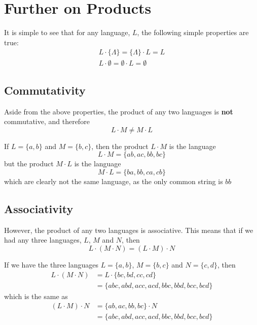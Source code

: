 \section*{Further on Products}

It is simple to see that for any language, $L$, the following simple properties are true:
\begin{gather*}
  L \cdot \{\Lambda\} = \{\Lambda\} \cdot L = L\\
  L \cdot \emptyset = \emptyset \cdot L = \emptyset
\end{gather*}

\subsection*{Commutativity}

Aside from the above properties, the product of any two languages is \textbf{not} commutative, and therefore
\begin{equation*}
  L \cdot M \neq M \cdot L
\end{equation*}

\begin{example*}{}{}
  If $L = \{a, b\}$ and $M = \{b, c\}$, then the product $L \cdot M$ is the language
  \begin{equation*}
    L \cdot M = \{ab, ac, bb, bc\}
  \end{equation*}
  but the product $M \cdot L$ is the language
  \begin{equation*}
    M \cdot L = \{ba, bb, ca, cb\}
  \end{equation*}
  which are clearly not the same language, as the only common string is $bb$
\end{example*}

\subsection*{Associativity}

However, the product of any two languages is associative. This means that if we had any three languages, $L$, $M$ and
 $N$, then
\begin{equation*}
  L \cdot (M \cdot N) = (L \cdot M) \cdot N
\end{equation*}

\begin{example*}{}{}
  If we have the three languages $L = \{a, b\}$, $M = \{b, c\}$ and $N = \{c, d\}$, then
  \begin{align*}
    L \cdot (M \cdot N) &= L \cdot \{bc, bd, cc, cd\}\\
    &= \{abc, abd, acc, acd, bbc, bbd, bcc, bcd\}
  \end{align*}
  which is the same as
  \begin{align*}
    (L \cdot M) \cdot N &= \{ab, ac, bb, bc\} \cdot N\\
    &= \{abc, abd, acc, acd, bbc, bbd, bcc, bcd\}
  \end{align*}
\end{example*}

